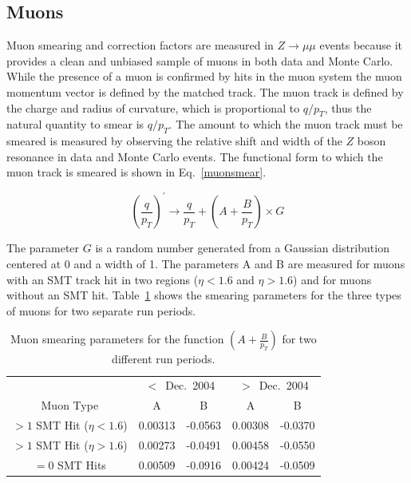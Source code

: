 \subsection{Muons}

Muon smearing and correction factors are measured in $Z\rightarrow \mu\mu$ events because it provides a clean and unbiased sample of muons in both data and Monte Carlo. While the presence of a muon is confirmed by hits in the muon system the muon momentum vector is defined by the matched track. The muon track is defined by the charge and radius of curvature, which is proportional to $q/p_{T}$, thus the natural quantity to smear is $q/p_{T}$. The amount to which the muon track must be smeared is measured by observing the relative shift and width of the $Z$ boson resonance in data and Monte Carlo events. The functional form to which the muon track is smeared is shown in Eq.~\ref{muonsmear}.

\begin{equation}
\label{muonsmear}
\left( \frac{q}{p_{T}} \right)^{'} \rightarrow \frac{q}{p_{T}} + (A + \frac{B}{p_{T}})\times G
\end{equation}

\noindent The parameter $G$ is a random number generated from a Gaussian distribution centered at 0 and a width of 1. The parameters A and B are measured for muons with an SMT track hit in two regions ($\eta<1.6$ and $\eta>1.6$) and for muons without an SMT hit. Table~\ref{muonsmearparam} shows the smearing parameters for the three types of muons for two separate run periods.


\begin{table}[!h!tbp]
\begin{center}
\caption{Muon smearing parameters for the function $(A + \frac{B}{p_{T}})$ for two different run periods.}
\label{muonsmearparam}
\begin{tabular}{c|cc|cc|}
       & \multicolumn{2}{|c|}{$<$~Dec.~2004} & \multicolumn{2}{|c}{$>$~Dec.~2004} \\
Muon Type				&	A		&	B		&	A		&	B		\\
\hline
$>1$ SMT Hit ($\eta<1.6$)	&	0.00313	&	-0.0563	&	0.00308	&	-0.0370	\\
$>1$ SMT Hit ($\eta>1.6$)	&	0.00273	&	-0.0491	&	0.00458	&	-0.0550	\\
$=0$ SMT Hits				&	0.00509	&	-0.0916	&	0.00424	&	-0.0509	\\
\end{tabular}
\vspace{-0.1 in}
\end{center}
\end{table} 


